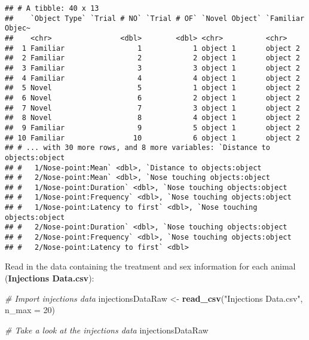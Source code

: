 \documentclass[]{article}
\newenvironment{Shaded}{\begin{snugshade}}{\end{snugshade}}
\newcommand{\KeywordTok}[1]{\textcolor[rgb]{0.13,0.29,0.53}{\textbf{#1}}}
\newcommand{\DataTypeTok}[1]{\textcolor[rgb]{0.13,0.29,0.53}{#1}}
\newcommand{\DecValTok}[1]{\textcolor[rgb]{0.00,0.00,0.81}{#1}}
\newcommand{\StringTok}[1]{\textcolor[rgb]{0.31,0.60,0.02}{#1}}
\newcommand{\CommentTok}[1]{\textcolor[rgb]{0.56,0.35,0.01}{\textit{#1}}}
\newcommand{\NormalTok}[1]{#1}
\begin{document}
\begin{verbatim}
## # A tibble: 40 x 13
##    `Object Type` `Trial # NO` `Trial # OF` `Novel Object` `Familiar Objec~
##    <chr>                <dbl>        <dbl> <chr>          <chr>           
##  1 Familiar                 1            1 object 1       object 2        
##  2 Familiar                 2            2 object 1       object 2        
##  3 Familiar                 3            3 object 1       object 2        
##  4 Familiar                 4            4 object 1       object 2        
##  5 Novel                    5            1 object 1       object 2        
##  6 Novel                    6            2 object 1       object 2        
##  7 Novel                    7            3 object 1       object 2        
##  8 Novel                    8            4 object 1       object 2        
##  9 Familiar                 9            5 object 1       object 2        
## 10 Familiar                10            6 object 1       object 2        
## # ... with 30 more rows, and 8 more variables: `Distance to objects:object
## #   1/Nose-point:Mean` <dbl>, `Distance to objects:object
## #   2/Nose-point:Mean` <dbl>, `Nose touching objects:object
## #   1/Nose-point:Duration` <dbl>, `Nose touching objects:object
## #   1/Nose-point:Frequency` <dbl>, `Nose touching objects:object
## #   1/Nose-point:Latency to first` <dbl>, `Nose touching objects:object
## #   2/Nose-point:Duration` <dbl>, `Nose touching objects:object
## #   2/Nose-point:Frequency` <dbl>, `Nose touching objects:object
## #   2/Nose-point:Latency to first` <dbl>
\end{verbatim}

Read in the data containing the treatment and sex information for each
animal (\textbf{Injections Data.csv}):

\begin{Shaded}
\begin{Highlighting}[]
\CommentTok{# Import injections data}
\NormalTok{injectionsDataRaw <-}\StringTok{ }\KeywordTok{read_csv}\NormalTok{(}\StringTok{"Injections Data.csv"}\NormalTok{, }\DataTypeTok{n_max =} \DecValTok{20}\NormalTok{)}

\CommentTok{# Take a look at the injections data}
\NormalTok{injectionsDataRaw}
\end{Highlighting}
\end{Shaded}
\end{document}
